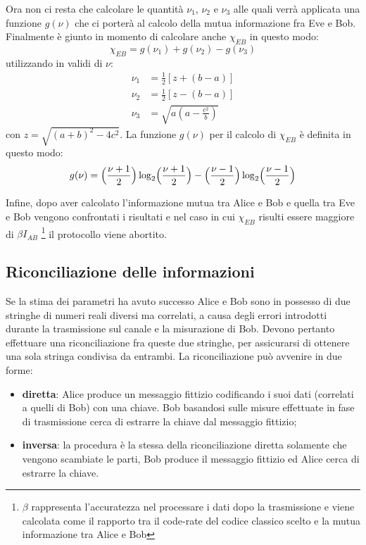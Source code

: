 Ora non ci resta che calcolare le quantit\`a $\nu_1$, $\nu_2$ e $\nu_3$ alle quali verr\`a applicata una funzione $g(\nu)$ che ci porter\`a al calcolo della mutua informazione fra Eve e Bob. Finalmente \`e giunto in momento di calcolare anche $\chi_{EB}$ in questo modo:
\begin{equation} \label{eq:EB-info}
\chi_{EB} = g(\nu_1) + g(\nu_2) - g(\nu_3)
\end{equation}
utilizzando in validi di $\nu$:
\begin{equation} \label{eq:nuCalc}
\begin{split}
\nu_1& = \frac{1}{2}[z + (b - a)] \\
\nu_2& = \frac{1}{2}[z - (b - a)] \\
\nu_3& = \sqrt{a (a - \frac{c^2}{b})}
\end{split}
\end{equation}
con $z = \sqrt{(a + b)^2 - 4 c^2}$.
La funzione $g(\nu)$ per il calcolo di $\chi_{EB}$ \`e definita in questo modo:
\begin{equation} \label{eq:g}
g(\nu) = \Bigl (\frac{\nu + 1}{2}\Bigr ) \log_2 \Bigl (\frac{\nu + 1}{2}\Bigr ) - \Bigl (\frac{\nu - 1}{2}\Bigr ) \log_2 \Bigl (\frac{\nu - 1}{2}\Bigr )
\end{equation}


Infine, dopo aver calcolato l'informazione mutua tra Alice e Bob e quella tra Eve e Bob vengono confrontati i risultati e nel caso in cui $\chi_{EB}$ risulti essere maggiore di $\beta I_{AB}$ \footnote{$\beta$ rappresenta l'accuratezza nel processare i dati dopo la trasmissione e viene calcolata come il rapporto tra il code-rate del codice classico scelto e la mutua informazione tra Alice e Bob} il protocollo viene abortito.

\subsection{Riconciliazione delle informazioni}\label{subse:riconciliazione}
Se la stima dei parametri ha avuto successo Alice e Bob sono in possesso di due stringhe di numeri reali diversi ma correlati, a causa degli errori introdotti durante la trasmissione sul canale e la misurazione di Bob. Devono pertanto effettuare una riconciliazione fra queste due stringhe, per assicurarsi di ottenere una sola stringa condivisa da entrambi. La riconciliazione pu\`o avvenire in due forme: 

\begin{itemize}
\item \textbf{diretta}: Alice produce un messaggio fittizio codificando i suoi dati (correlati a quelli di Bob) con una chiave. Bob basandosi sulle misure effettuate in fase di trasmissione cerca di estrarre la chiave dal messaggio fittizio;
\item \textbf{inversa}: la procedura \`e la stessa della riconciliazione diretta solamente che vengono scambiate le parti, Bob produce il messaggio fittizio ed Alice cerca di estrarre la chiave.
\end{itemize} 
 
